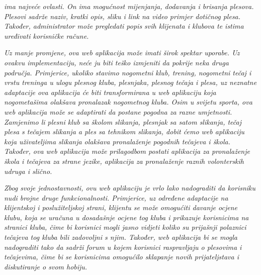 \textit{ ima najveće ovlasti. On ima mogućnost mijenjanja, dodavanja i brisanja plesova. Plesovi sadrže naziv, kratki opis, sliku i link na video primjer dotičnog plesa. Također, administrator može pregledati popis svih klijenata i klubova te istima uređivati korisničke račune.}

\textit{Uz manje promjene, ova web aplikacija može imati širok spektar uporabe. Uz ovakvu implementaciju, neće ju biti teško izmjeniti da pokrije neka druga područja. Primjerice, ukoliko stavimo nogometni klub, trening, nogometni tečaj i vrstu treninga u ulogu plesnog kluba, plesnjaka, plesnog tečaja i plesa, uz neznatne adaptacije ova aplikacija će biti transformirana u web aplikaciju koja nogometašima olakšava pronalazak nogometnog kluba. Osim u svijetu sporta, ova web aplikacija može se adaptirati da postane pogodna za razne umjetnosti. Zamjenimo li plesni klub sa školom slikanja, plesnjak sa satom slikanja, tečaj plesa s tečajem slikanja a ples sa tehnikom slikanja, dobit ćemo web aplikaciju koja uživateljima slikanja olakšava pronalaženje pogodnih tečajeva i škola. Također, ova web aplikacija može prilagodbom postati aplikacija za pronalaženje škola i tečajeva za strane jezike, aplikacija za pronalaženje raznih volonterskih udruga i slično.}

\textit{Zbog svoje jednostavnosti, ovu web aplikaciju je vrlo lako nadograditi da korisniku nudi brojne druge funkcionalnosti. Primjerice, uz određene adaptacije na klijentskoj i poslužiteljskoj strani, klijentu se može omogućiti davanje ocjene klubu, koja se uračuna u dosadašnje ocjene tog kluba i prikazuje korisnicima na stranici kluba, čime bi korisnici mogli jasno vidjeti koliko su prijašnji polaznici tečajeva tog kluba bili zadovoljni s njim. Također, web aplikacija bi se mogla nadograditi tako da sadrži forum u kojem korisnici raspravljaju o plesovima i tečajevima, čime bi se korisnicima omogućilo sklapanje novih prijateljstava i diskutiranje o svom hobiju.} 		
	
